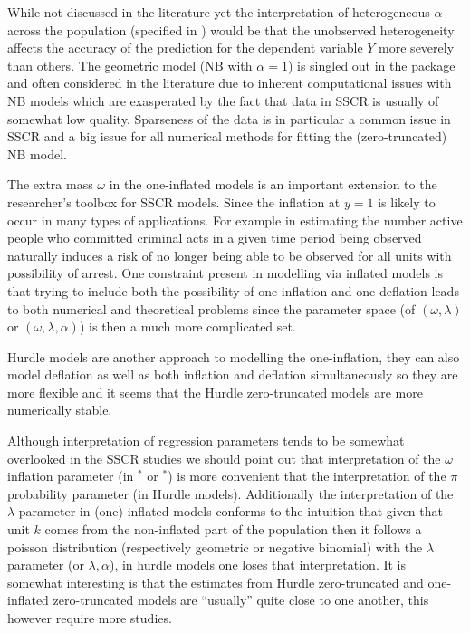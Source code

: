 \documentclass[
]{jss}
\newcommand{\1}{\mathcal{I}} \newcommand{\bZero}{\boldsymbol{0}}
\begin{document}
While not discussed in the literature yet the interpretation of
heterogeneous \(\alpha\) across the population (specified in
) would be that the unobserved heterogeneity affects
the accuracy of the prediction for the dependent variable \(Y\) more
severely than others. The geometric model (NB with \(\alpha=1\)) is
singled out in the package and often considered in the literature due to
inherent computational issues with NB models which are exasperated by
the fact that data in SSCR is usually of somewhat low quality.
Sparseness of the data is in particular a common issue in SSCR and a big
issue for all numerical methods for fitting the (zero-truncated) NB
model.

The extra mass \(\omega\) in the one-inflated models is an important
extension to the researcher's toolbox for SSCR models. Since the
inflation at \(y=1\) is likely to occur in many types of applications.
For example in estimating the number active people who committed
criminal acts in a given time period being observed naturally induces a
risk of no longer being able to be observed for all units with
possibility of arrest. One constraint present in modelling via inflated
models is that trying to include both the possibility of one inflation
and one deflation leads to both numerical and theoretical problems since
the parameter space (of \((\omega, \lambda)\) or
\((\omega, \lambda, \alpha)\)) is then a much more complicated set.

Hurdle models are another approach to modelling the one-inflation, they
can also model deflation as well as both inflation and deflation
simultaneously so they are more flexible and it seems that the Hurdle
zero-truncated models are more numerically stable.

Although interpretation of regression parameters tends to be somewhat
overlooked in the SSCR studies we should point out that interpretation
of the \(\omega\) inflation parameter (in \(^\ast\) or
\(^\ast\)) is more convenient that the interpretation of the
\(\pi\) probability parameter (in Hurdle models). Additionally the
interpretation of the \(\lambda\) parameter in (one) inflated models
conforms to the intuition that given that unit \(k\) comes from the
non-inflated part of the population then it follows a poisson
distribution (respectively geometric or negative binomial) with the
\(\lambda\) parameter (or \(\lambda,\alpha\)), in hurdle models one
loses that interpretation. It is somewhat interesting is that the
estimates from Hurdle zero-truncated and one-inflated zero-truncated
models are ``usually'' quite close to one another, this however require
more studies.
\end{document}
